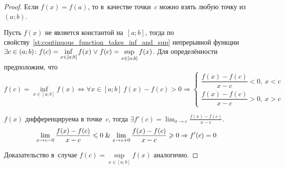 \begin{wrapfigure}{r}{0pt}
\noindent
{}
\end{wrapfigure}

\begin{proof}
Если $f(x) = f(a)$, то в~качестве точки~$c$ можно взять любую точку из~$(a; b)$.

Пусть $f(x)$ не является константой на~$[a; b]$, тогда по свойству~\ref{st:continuous_function_takes_inf_and_sup} непрерывной функции $\displaystyle \exists c \in (a; b) \colon \allowbreak f(c) \opbr= \inf_{x \in [a; b]} f(x) \lOr f(c) = \sup_{x \in [a; b]} f(x)$.
Для определённости предположим, что
\begin{equation*}
f(c) = \inf_{x \in [a; b]} f(x) \Leftrightarrow
\forall x \in [a; b] \ f(x) - f(c) > 0 \Rightarrow
\begin{cases}
\dfrac{f(x) - f(c)}{x - c} < 0, \ x < c \\
\dfrac{f(x) - f(c)}{x - c} > 0, \ x > c
\end{cases}
\end{equation*}

$f(x)$ дифференцируема в точке~$c$, тогда $\displaystyle \exists f'(c) = \lim_{x \to c} \frac{f(x) - f(c)}{x - c}$.
\begin{equation*}
\lim_{x \to c-0} \frac{f(x) - f(c)}{x - c} \leqslant 0 \mathrel{\&}
\lim_{x \to c+0} \frac{f(x) - f(c)}{x - c} \geqslant 0 \Rightarrow
f'(c) = 0
\end{equation*}

Доказательство в~случае $f(c) = \sup\limits_{x \in [a; b]} f(x)$ аналогично.
\end{proof}

